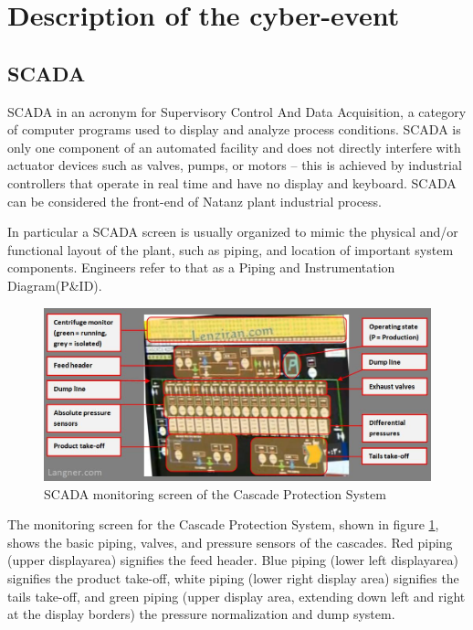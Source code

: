 \documentclass[12pt]{article}
\begin{document}
\section{Description of the cyber-event}

\subsection{SCADA}
SCADA in an acronym for Supervisory Control And Data Acquisition, a category of computer programs used to display and analyze process conditions. SCADA is only one component of an automated facility and does not directly interfere with actuator devices such as valves, pumps, or motors – this is achieved by industrial controllers that operate in real time and have no display and keyboard. SCADA can be considered the front-end of Natanz plant industrial process.

In particular a SCADA screen is usually organized to mimic the physical and/or functional layout of the plant, such as piping, and location of important system components. Engineers refer to that as a Piping and Instrumentation Diagram(P\&ID).
    
    \begin{figure}[H]
    \centering
    \includegraphics[height=0.45\textwidth]{scadaS.png}
    \caption{SCADA monitoring screen of the Cascade Protection System}
    \label{fig:scadaS}
    \end{figure}

The monitoring screen for the Cascade Protection System, shown in figure \ref{fig:scadaS}, shows the basic piping, valves, and pressure sensors of the cascades. Red piping (upper displayarea) signifies the feed header. Blue piping (lower left displayarea) signifies the product take-off, white piping (lower right display area) signifies the tails take-off, and green piping (upper display area, extending down left and right at the display borders) the pressure normalization and dump system.
\end{document}
